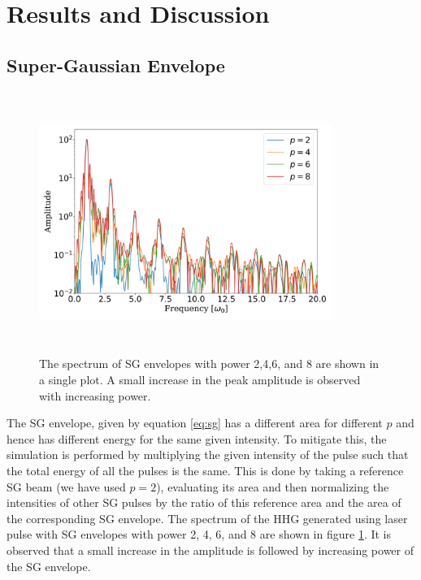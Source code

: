 \documentclass[12pt]{article}
\begin{document}
\section{Results and Discussion}
\subsection{Super-Gaussian Envelope}
\begin{figure}[h]
    \centering
    \includegraphics[width=0.85\textwidth, height=8.5cm]{images/sg.png}
    \caption{The spectrum of SG envelopes with power 2,4,6, and 8 are shown in a single plot. A small increase in the peak amplitude is observed with increasing power.}
    \label{fig:sg}
\end{figure}

The SG envelope, given by equation \ref{eq:sg} has a different area for different $p$ and hence has different energy for the same given intensity. To mitigate this, the simulation is performed by multiplying the given intensity of the pulse such that the total energy of all the pulses is the same. This is done by taking a reference SG beam (we have used $p=2$), evaluating its area and then normalizing the intensities of other SG pulses by the ratio of this reference area and the area of the corresponding SG envelope. The spectrum of the HHG generated using laser pulse with SG envelopes with power 2, 4, 6, and 8 are shown in figure \ref{fig:sg}. It is observed that a small increase in the amplitude is followed by increasing power of the SG envelope.
\end{document}
